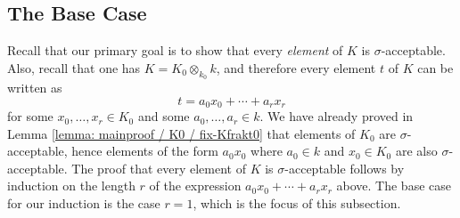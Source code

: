 \documentclass[11pt]{amsart}
\theoremstyle{definition}
\theoremstyle{remark}
\numberwithin{equation}{section}
\begin{document}
\subsection{The Base Case}
\label{subsection: mainproof / base-case}

Recall that our primary goal is to show that every \emph{element} of $K$ is $\sigma$-acceptable.
Also, recall that one has $K = K_0 \otimes_{k_0} k$, and therefore every element $t$ of $K$ can be written as
\[ t = a_0 x_0 + \cdots + a_r x_r \]
for some $x_0,\ldots,x_r \in K_0$ and some $a_0,\ldots,a_r \in k$.
We have already proved in Lemma \ref{lemma: mainproof / K0 / fix-Kfrakt0} that elements of $K_0$ are $\sigma$-acceptable, hence elements of the form $a_0 x_0$ where $a_0 \in k$ and $x_0 \in K_0$ are also $\sigma$-acceptable.
The proof that every element of $K$ is $\sigma$-acceptable follows by induction on the length $r$ of the expression $a_0 x_0 + \cdots + a_r x_r$ above.
The base case for our induction is the case $r = 1$, which is the focus of this subsection.
\end{document}
